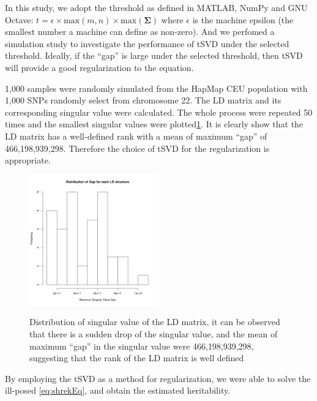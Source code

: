 \documentclass{book}
\begin{document}
			In this study, we adopt the threshold as defined in MATLAB, NumPy and GNU Octave: $t=\epsilon\times\mathrm{max}(m,n)\times\mathrm{max}(\boldsymbol{\Sigma})$ where $\epsilon$ is the machine epsilon (the smallest number a machine can define as non-zero). 
			And we perfomed a simulation study to investigate the performance of \gls{tSVD} under the selected threshold.
			Ideally, if the ``gap'' is large under the selected threshold, then \gls{tSVD} will provide a good regularization to the equation. 
			
			1,000 samples were randomly simulated from the HapMap\citep{Altshuler2010} \acrshort{CEU} population with
			1,000 \glspl{SNP} randomly select from chromosome 22. 
			The \gls{LD} matrix and its corresponding singular value were calculated. 
			The whole process were repeated 50 times and the smallest singular values were plotted\cref{fig:singularValueDist}. 
			It is clearly show that the \gls{LD} matrix has a well-defined rank with a mean of maximum ``gap'' of 466,198,939,298.
			Therefore the choice of \gls{tSVD} for the regularization is appropriate.
			\begin{figure}
				\caption[Distribution of singular value of the LD matrix]{Distribution of singular value of the LD matrix, it can be observed that there is a sudden drop of the singular value, and the mean of maximum ``gap'' in the singular value were 466,198,939,298, suggesting that the rank of the LD matrix is well defined}
				\centering
				\includegraphics[width=0.5\textwidth]{figure/singular_value_distribution.png}
				\label{fig:singularValueDist}
			\end{figure}
			
			By employing the \gls{tSVD} as a method for regularization, we were able to solve the ill-posed \cref{eq:shrekEq}, and obtain the estimated heritability.
			
			
	
\end{document}
